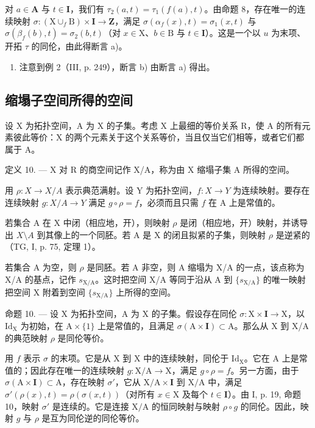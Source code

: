 对 \(a \in \mathbf{A}\) 与 \(t \in \mathbf{I}\)，我们有 \(\tau_2(a, t) = \tau_1(f(a), t)\)。由命题 8，存在唯一的连续映射 \(\sigma: (\mathrm{X} \cup_f \mathrm{B}) \times \mathbf{I} \to \mathbf{Z}\)，满足 \(\sigma(\alpha_f(x), t) = \sigma_1(x, t)\) 与 \(\sigma(\beta_f(b), t) = \sigma_2(b, t)\)（对 \(x \in \mathrm{X}\)、\(b \in \mathrm{B}\) 与 \(t \in \mathbf{I}\)）。这是一个以 \(u\) 为末项、开拓 \(\tau\) 的同伦，由此得断言 a)。

\begin{enumerate}
\def\labelenumi{\alph{enumi})}
\setcounter{enumi}{1}
\tightlist
\item
  注意到例 2（III, p. 249），断言 b) 由断言 a) 得出。
\end{enumerate}

\subsection{缩塌子空间所得的空间}

设 X 为拓扑空间，A 为 X 的子集。考虑 X 上最细的等价关系 R，使 A 的所有元素彼此等价：X 的两个元素关于这个关系等价，当且仅当它们相等，或者它们都属于 A。

定义 10. --- X 对 R 的商空间记作 X/A，称为由 X 缩塌子集 A 所得的空间。

用 \(\rho\colon X\to X/A\) 表示典范满射。设 Y 为拓扑空间，\(f\colon X\to Y\) 为连续映射。要存在连续映射 \(g\colon X/A\to Y\) 满足 \(g\circ\rho=f\)，必须而且只需 \(f\) 在 A 上是常值的。

若集合 A 在 X 中闭（相应地，开），则映射 \(\rho\) 是闭（相应地，开）映射，并诱导出 \(X\setminus A\) 到其像上的一个同胚。若 A 是 X 的闭且拟紧的子集，则映射 \(\rho\) 是逆紧的（TG, I, p. 75, 定理 1）。

若集合 A 为空，则 \(\rho\) 是同胚。若 A 非空，则 A 缩塌为 X/A 的一点，该点称为 X/A 的基点，记作 \(s_{\mathrm{X / A}}\)。这时把空间 X/A 等同于沿从 A 到 \(\{s_{\mathrm{X / A}}\}\) 的唯一映射把空间 X 附着到空间 \(\{s_{\mathrm{X / A}}\}\) 上所得的空间。

命题 10. --- 设 X 为拓扑空间，A 为 X 的子集。假设存在同伦 \(\sigma: \mathrm{X} \times \mathbf{I} \to \mathrm{X}\)，以 \(\mathrm{Id}_{\mathrm{X}}\) 为初始，在 \(\mathrm{A} \times \{1\}\) 上是常值的，且满足 \(\sigma(\mathrm{A} \times \mathbf{I}) \subset \mathrm{A}\)。那么从 X 到 X/A 的典范映射 \(\rho\) 是同伦等价。

用 \(f\) 表示 \(\sigma\) 的末项。它是从 X 到 X 中的连续映射，同伦于 \(\mathrm{Id}_{\mathrm{X}}\)。它在 A 上是常值的；因此存在唯一的连续映射 \(g \colon \mathrm{X} / \mathrm{A} \to \mathrm{X}\)，满足 \(g \circ \rho = f\)。另一方面，由于 \(\sigma(\mathrm{A} \times \mathbf{I}) \subset \mathrm{A}\)，存在映射 \(\sigma'\)，它从 \(\mathrm{X} / \mathrm{A} \times \mathbf{I}\) 到 \(\mathrm{X} / \mathrm{A}\) 中，满足 \(\sigma'(\rho(x), t) = \rho(\sigma(x, t))\)（对所有 \(x \in \mathrm{X}\) 及每个 \(t \in \mathbf{I}\)）。由 I, p. 19, 命题 10，映射 \(\sigma'\) 是连续的。它是连接 \(\mathrm{X} / \mathrm{A}\) 的恒同映射与映射 \(\rho \circ g\) 的同伦。因此，映射 \(g\) 与 \(\rho\) 是互为同伦逆的同伦等价。

